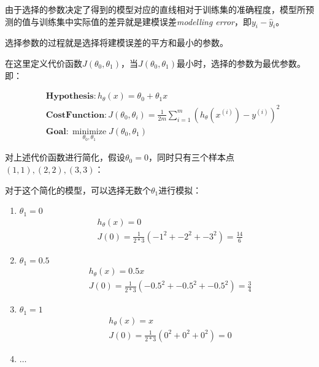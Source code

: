 \documentclass[12pt, a4paper]{article}
\begin{document}
            由于选择的参数决定了得到的模型对应的直线相对于训练集的准确程度，模型所预测的值与训练集中实际值的差异就是建模误差\textit{modelling error}，即$y_i - \hat{y}_i$。

            选择参数的过程就是选择将建模误差的平方和最小的参数。
            
            在这里定义代价函数$J(\theta_0, \theta_1)$，当$J(\theta_0, \theta_1)$最小时，选择的参数为最优参数。即：

            \begin{align*}
                &\mathbf{Hypothesis}: h_\theta(x)=\theta_0 + \theta_1x \\
                &\mathbf{Cost Function}: J(\theta_0, \theta_i) = \frac{1}{2m}\sum_{i=1}^{m}(h_\theta(x^{(i)})-y^{(i)})^2 \\
                &\mathbf{Goal}: \mathop{minimize}\limits_{\theta_0, \theta_1}J(\theta_0, \theta_1)
            \end{align*}

            对上述代价函数进行简化，假设$\theta_0=0$，同时只有三个样本点$(1,1),(2,2),(3,3)$：

            对于这个简化的模型，可以选择无数个$\theta_1$进行模拟：
            
            \begin{enumerate}
                \item $\theta_1=0$
                \begin{align*}
                    &h_\theta(x) = 0 \\
                    &J(0) = \frac{1}{2*3}(-1^2+-2^2+-3^2) = \frac{14}{6}
                \end{align*}
                \item $\theta_1=0.5$
                \begin{align*}
                    &h_\theta(x) = 0.5x \\
                    &J(0) = \frac{1}{2*3}(-0.5^2+-0.5^2+-0.5^2) = \frac{3}{4}
                \end{align*}
                \item $\theta_1=1$
                \begin{align*}
                    &h_\theta(x) = x \\
                    &J(0) = \frac{1}{2*3}(0^2+0^2+0^2) = 0
                \end{align*}
                \item $\dots$
            \end{enumerate}
\end{document}
